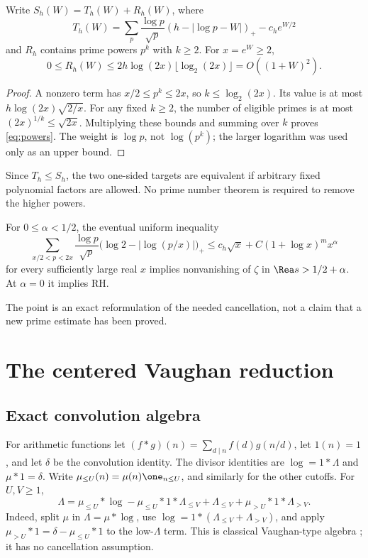 \begin{proposition}
Write $S_h(W)=T_h(W)+R_h(W)$, where
\[
T_h(W)=\sum_p\frac{\log p}{\sqrt p}(h-|\log p-W|)_+-c_he^{W/2}
\]
and $R_h$ contains prime powers $p^k$ with $k\ge2$. For $x=e^W\ge2$,
\begin{equation}\label{eq:powers}
0\le R_h(W)\le2h\log(2x)\lfloor\log_2(2x)\rfloor=O((1+W)^2).
\end{equation}
\end{proposition}
\begin{proof}
A nonzero term has $x/2\le p^k\le2x$, so $k\le\log_2(2x)$. Its value is at most $h\log(2x)\sqrt{2/x}$. For any fixed $k\ge2$, the number of eligible primes is at most $(2x)^{1/k}\le\sqrt{2x}$. Multiplying these bounds and summing over $k$ proves \eqref{eq:powers}. The weight is $\log p$, not $\log(p^k)$; the larger logarithm was used only as an upper bound.
\end{proof}
Since $T_h\le S_h$, the two one-sided targets are equivalent if arbitrary fixed polynomial factors are allowed. No prime number theorem is required to remove the higher powers.
\begin{corollary}
For $0\le\alpha<1/2$, the eventual uniform inequality
\[
\sum_{x/2<p<2x}\frac{\log p}{\sqrt p}\bigl(\log2-|\log(p/x)|\bigr)_+
\le c_h\sqrt x+C(1+\log x)^mx^\alpha
\]
for every sufficiently large real $x$ implies nonvanishing of $\zeta$ in $\Rea s>1/2+\alpha$. At $\alpha=0$ it implies RH.
\end{corollary}
The point is an exact reformulation of the needed cancellation, not a claim that a new prime estimate has been proved.

\section{The centered Vaughan reduction}
\subsection{Exact convolution algebra}
For arithmetic functions let $(f*g)(n)=\sum_{d\mid n}f(d)g(n/d)$, let $1(n)=1$, and let $\delta$ be the convolution identity. The divisor identities are $\log=1*\Lambda$ and $\mu*1=\delta$. Write $\mu_{\le U}(n)=\mu(n)\one_{n\le U}$, and similarly for the other cutoffs. For $U,V\ge1$,
\begin{equation}\label{eq:vaughan}
\Lambda=\mu_{\le U}*\log-\mu_{\le U}*1*\Lambda_{\le V}+\Lambda_{\le V}+\mu_{>U}*1*\Lambda_{>V}.
\end{equation}
Indeed, split $\mu$ in $\Lambda=\mu*\log$, use $\log=1*(\Lambda_{\le V}+\Lambda_{>V})$, and apply $\mu_{>U}*1=\delta-\mu_{\le U}*1$ to the low-$\Lambda$ term. This is classical Vaughan-type algebra \cite{vaughan}; it has no cancellation assumption.

